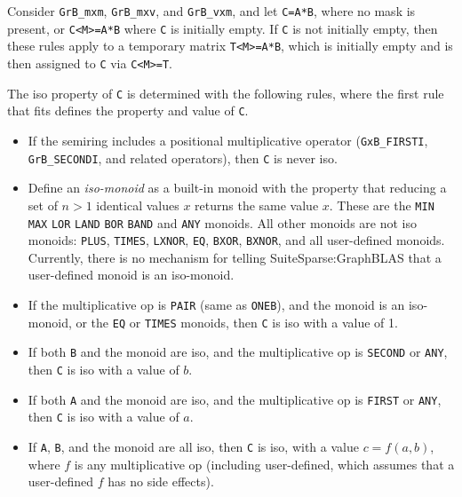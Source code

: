 \documentclass[12pt]{article}
\begin{document}
{Consider \verb'GrB_mxm', \verb'GrB_mxv', and \verb'GrB_vxm', and
    let \verb'C=A*B', where no mask is present, or \verb'C<M>=A*B' where
    \verb'C' is initially empty.  If \verb'C' is not initially empty,
    then these rules apply to a temporary matrix \verb'T<M>=A*B', which is
    initially empty and is then assigned to \verb'C' via \verb'C<M>=T'.

    The iso property of \verb'C' is determined with the following rules,
    where the first rule that fits defines the property and value of \verb'C'.

    \begin{itemize}
    \item If the semiring includes a positional multiplicative operator
    (\verb'GxB_FIRSTI', \verb'GrB_SECONDI', and related operators), then
    \verb'C' is never iso.

    \item Define an {\em iso-monoid} as a built-in monoid with the property
    that reducing a set of $n>1$ identical values $x$ returns the same value
    $x$.  These are the \verb'MIN' \verb'MAX' \verb'LOR' \verb'LAND' \verb'BOR'
    \verb'BAND' and \verb'ANY' monoids.  All other monoids are not iso monoids:
    \verb'PLUS', \verb'TIMES', \verb'LXNOR', \verb'EQ', \verb'BXOR',
    \verb'BXNOR', and all user-defined monoids.   Currently, there is no
    mechanism for telling SuiteSparse:GraphBLAS that a user-defined monoid
    is an iso-monoid.

    \item If the multiplicative op is \verb'PAIR' (same as \verb'ONEB'),
    and the monoid is an
    iso-monoid, or the \verb'EQ' or \verb'TIMES' monoids, then \verb'C' is
    iso with a value of 1.

    \item If both \verb'B' and the monoid are iso, and the multiplicative op is
    \verb'SECOND' or \verb'ANY', then \verb'C' is iso with a value of $b$.

    \item If both \verb'A' and the monoid are iso, and the multiplicative op is
    \verb'FIRST' or \verb'ANY', then \verb'C' is iso with a value of $a$.

    \item If \verb'A', \verb'B', and the monoid are all iso, then \verb'C'
    is iso, with a value $c=f(a,b)$, where $f$ is any multiplicative op
    (including user-defined, which assumes that a user-defined $f$ has no 
    side effects).


\end{itemize}}
\end{document}
